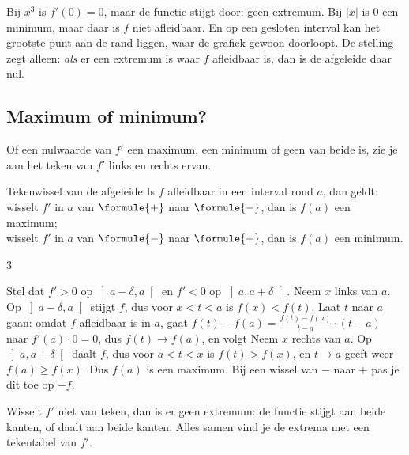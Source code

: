 Bij $x^3$ is $f'(0) = 0$, maar de functie stijgt door: geen extremum. Bij $|x|$ is $0$ een minimum, maar daar is $f$ niet afleidbaar. En op een gesloten interval kan het grootste punt aan de rand liggen, waar de grafiek gewoon doorloopt. De stelling zegt alleen: \textit{als} er een extremum is waar $f$ afleidbaar is, dan is de afgeleide daar nul.

\subsection{Maximum of minimum?}

Of een nulwaarde van $f'$ een maximum, een minimum of geen van beide is, zie je aan het teken van $f'$ links en rechts ervan.

\begin{theorie}
\begin{stelling}{Tekenwissel van de afgeleide}
Is $f$ afleidbaar in een interval rond $a$, dan geldt: \\[1mm]
\qquad wisselt $f'$ in $a$ van $\formule{+}$ naar $\formule{-}$, dan is $f(a)$ een maximum; \\
\qquad wisselt $f'$ in $a$ van $\formule{-}$ naar $\formule{+}$, dan is $f(a)$ een minimum.
\end{stelling}
\begin{alleenvoor}{3}
\begin{bewijs}
Stel dat $f' > 0$ op $\left]a - \delta, a\right[$ en $f' < 0$ op $\left]a, a + \delta\right[$. Neem $x$ links van $a$. Op $\left]a - \delta, a\right[$ stijgt $f$, dus voor $x < t < a$ is $f(x) < f(t)$. Laat $t$ naar $a$ gaan: omdat $f$ afleidbaar is in $a$, gaat $f(t) - f(a) = \frac{f(t) - f(a)}{t - a} \cdot (t - a)$ naar $f'(a) \cdot 0 = 0$, dus $f(t) \to f(a)$, en volgt
Neem $x$ rechts van $a$. Op $\left]a, a + \delta\right[$ daalt $f$, dus voor $a < t < x$ is $f(t) > f(x)$, en $t \to a$ geeft weer $f(a) \geqslant f(x)$. Dus $f(a)$ is een maximum. Bij een wissel van $-$ naar $+$ pas je dit toe op $-f$.
\end{bewijs}
\end{alleenvoor}
\end{theorie}

Wisselt $f'$ niet van teken, dan is er geen extremum: de functie stijgt aan beide kanten, of daalt aan beide kanten. Alles samen vind je de extrema met een tekentabel van $f'$.

